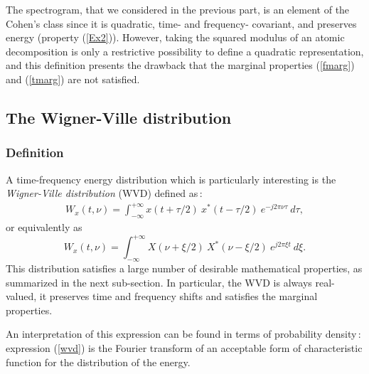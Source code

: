   The spectrogram, that we considered in the previous part, is an element
of the Cohen's class since it is quadratic, time- and frequency- covariant,
and preserves energy (property (\ref{Ex2})).  However, taking the squared
modulus of an atomic decomposition is only a restrictive possibility to
define a quadratic representation, and this definition presents the
drawback that the marginal properties (\ref{fmarg}) and (\ref{tmarg}) are
not satisfied.


\subsection{The Wigner-Ville distribution}
\label{WVD}
\subsubsection{Definition}
A time-frequency energy distribution which
is particularly interesting is the {\it Wigner-Ville distribution} (WVD)
defined as\,:
\begin{eqnarray}
\label{wvd}
W_x(t,\nu)=\int_{-\infty}^{+\infty} x(t+\tau/2)\ x^*(t-\tau/2)\ e^{-j2\pi
\nu \tau}\ d\tau,   
\end{eqnarray}
or equivalently as
\[W_x(t,\nu)=\int_{-\infty}^{+\infty} X(\nu+\xi/2)\ X^*(\nu-\xi/2)\
e^{j2\pi \xi t}\ d\xi.\] This distribution satisfies a large number of
desirable mathematical properties, as summarized in the next
sub-section. In particular, the WVD is always real-valued, it preserves
time and frequency shifts and satisfies the marginal properties.

  An interpretation of this expression can be found in terms of probability
density\,: expression (\ref{wvd}) is the Fourier transform of an acceptable
form of characteristic function for the distribution of the energy.

